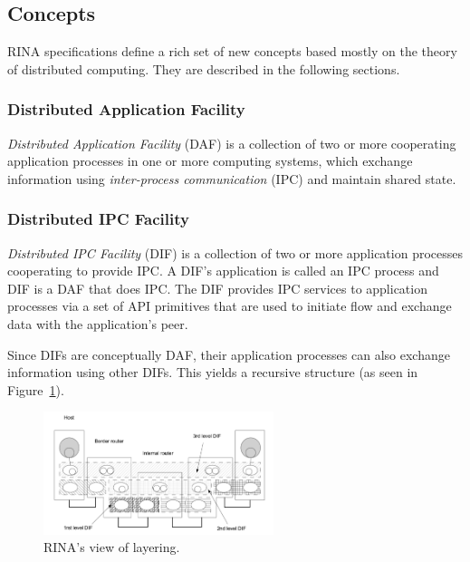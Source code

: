         \subsection{Concepts}

            RINA specifications define a rich set of new concepts based mostly on the theory of distributed computing. They are described in the following sections.

            \subsubsection{Distributed Application Facility}

                \emph{Distributed Application Facility} (DAF) is a collection of two or more cooperating application processes in one or more computing systems, which exchange information using \emph{inter-process communication} (IPC) and maintain shared state.

            \subsubsection{Distributed IPC Facility}

                \emph{Distributed IPC Facility} (DIF) is a collection of two or more application processes cooperating to provide IPC. A DIF's application is called an IPC process and DIF is a DAF that does IPC. The DIF provides IPC services to application processes via a set of API primitives that are used to initiate flow and exchange data with the application's peer.

                Since DIFs are conceptually DAF, their application processes can also exchange information using other DIFs. This yields a recursive structure (as seen in Figure~\ref{fig:rina_layers}).

                \begin{figure}[H]
                    \begin{center}
                        \includegraphics[width=0.6\textwidth]{fig/archs_rina-net.png}
                      \caption{RINA's view of layering.}
                      \label{fig:rina_layers}
                    \end{center}
                \end{figure}

